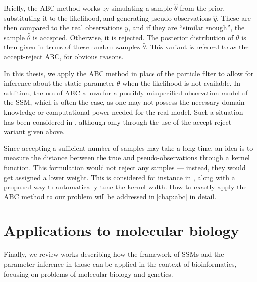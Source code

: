 Briefly, the ABC method works by simulating a sample $\hat{\theta}$ from the prior, substituting it to the likelihood, and generating pseudo-observations $\hat{y}$. These are then compared to the real observations $y$, and if they are ``similar enough'', the sample $\hat{\theta}$ is accepted. Otherwise, it is rejected. The posterior distribution of $\theta$ is then given in terms of these random samples $\hat{\theta}$. This variant is referred to as the accept-reject ABC, for obvious reasons.

In this thesis, we apply the ABC method in place of the particle filter to allow for inference about the static parameter $\theta$ when the likelihood is not available. In addition, the use of ABC allows for a possibly misspecified observation model of the SSM, which is often the case, as one may not possess the necessary domain knowledge or computational power needed for the real model. Such a situation has been considered in \cite{jasra-time-series}, although only through the use of the accept-reject variant given above.

Since accepting a sufficient number of samples may take a long time, an idea is to measure the distance between the true and pseudo-observations through a kernel function. This formulation would not reject any samples --- instead, they would get assigned a lower weight. This is considered for instance in \cite{dedecius}, along with a proposed way to automatically tune the kernel width. How to exactly apply the ABC method to our problem will be addressed in \autoref{chap:abc} in detail.

\section{Applications to molecular biology}
Finally, we review works describing how the framework of SSMs and the parameter inference in those can be applied in the context of bioinformatics, focusing on problems of molecular biology and genetics.